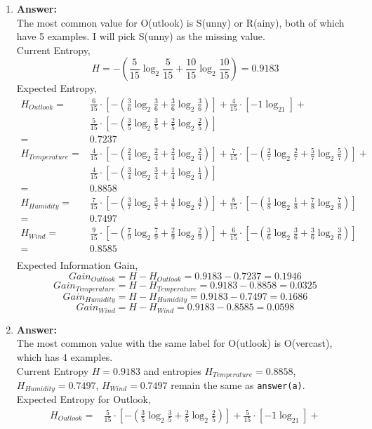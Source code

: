 \documentclass[12pt, fullpage,letterpaper]{article}
\begin{document}
\begin{enumerate}
\begin{enumerate}
\item \textbf{Answer:}\\
The most common value for O(utlook) is S(unny) or R(ainy), both of which have 5 examples. I will pick S(unny) as the missing value.\\
Current Entropy,
$$H=-(\frac{5}{15}\log_2\frac{5}{15}+\frac{10}{15}\log_2\frac{10}{15})=0.9183$$
Expected Entropy,
\begin{align*}
H_{Outlook}=&\frac{6}{15} \cdot [-(\frac{3}{6}\log_2\frac{3}{6}+\frac{3}{6}\log_2\frac{3}{6})]+\frac{4}{15} \cdot [-1\log_21]+\\
&\frac{5}{15} \cdot [-(\frac{3}{5}\log_2\frac{3}{5}+\frac{2}{5}\log_2\frac{2}{5})]\\
=&0.7237\\
H_{Temperature}=&\frac{4}{15} \cdot [-(\frac{2}{4}\log_2\frac{2}{4}+\frac{2}{4}\log_2\frac{2}{4})]+\frac{7}{15} \cdot [-(\frac{2}{7}\log_2\frac{2}{7}+\frac{5}{7}\log_2\frac{5}{7})]+\\
&\frac{4}{15} \cdot [-(\frac{3}{4}\log_2\frac{3}{4}+\frac{1}{4}\log_2\frac{1}{4})]\\
=&0.8858\\
H_{Humidity}=&\frac{7}{15} \cdot [-(\frac{3}{7}\log_2\frac{3}{7}+\frac{4}{7}\log_2\frac{4}{7})]+\frac{8}{15} \cdot [-(\frac{1}{8}\log_2\frac{1}{8}+\frac{7}{8}\log_2\frac{7}{8})]\\
=&0.7497\\
H_{Wind}=&\frac{9}{15} \cdot [-(\frac{7}{9}\log_2\frac{7}{9}+\frac{2}{9}\log_2\frac{2}{9})]+\frac{6}{15} \cdot [-(\frac{3}{6}\log_2\frac{3}{6}+\frac{3}{6}\log_2\frac{3}{6})]\\
=&0.8585\\
\end{align*}
Expected Information Gain,
$$Gain_{Outlook}=H-H_{Outlook}=0.9183-0.7237=0.1946$$
$$Gain_{Temperature}=H-H_{Temperature}=0.9183-0.8858=0.0325$$
$$Gain_{Humidity}=H-H_{Humidity}=0.9183-0.7497=0.1686$$
$$Gain_{Wind}=H-H_{Wind}=0.9183-0.8585=0.0598$$
\item \textbf{Answer:}\\
The most common value with the same label for O(utlook) is O(vercast), which has 4 examples.\\
Current Entropy $H=0.9183$ and entropies $H_{Temperature}=0.8858$, $H_{Humidity}=0.7497$, $H_{Wind}=0.7497$ remain the same as \texttt{answer(a)}.\\
Expected Entropy for Outlook,
\begin{align*}
H_{Outlook}=&\frac{5}{15} \cdot [-(\frac{3}{5}\log_2\frac{3}{5}+\frac{2}{5}\log_2\frac{2}{5})]+\frac{5}{15} \cdot [-1\log_21]+\\

\end{align*}
\end{enumerate}
\end{enumerate}
\end{document}
